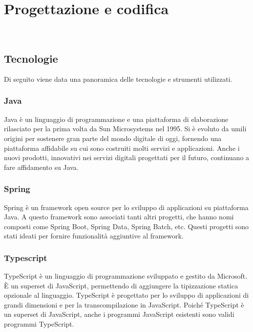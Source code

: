 
\chapter{Progettazione e codifica}
\label{cap:progettazione-codifica}

\\

\section{Tecnologie}
\label{sec:tecnologie-strumenti}

Di seguito viene data una panoramica delle tecnologie e strumenti utilizzati.

\subsection*{Java}
Java è un linguaggio di programmazione e una piattaforma di elaborazione 
rilasciato per la prima volta da Sun Microsystems nel 1995. Si è evoluto da umili
 origini per sostenere gran parte del mondo digitale di oggi, fornendo una
 piattaforma affidabile su cui sono costruiti molti servizi e applicazioni. 
 Anche i nuovi prodotti, innovativi nei servizi digitali progettati per il futuro,  
 continuano a fare affidamento su Java.
\subsection*{Spring}

Spring è un \gls{framework} open source per lo sviluppo di applicazioni su piattaforma Java.
A questo \gls{framework} sono associati tanti altri progetti, che hanno nomi composti come 
Spring Boot, Spring Data, Spring Batch, etc. Questi progetti sono stati ideati per
fornire funzionalità aggiuntive al \gls{framework}.

\subsection*{Typescript}
TypeScript è un linguaggio di programmazione sviluppato e gestito da Microsoft. 
È un \gls{superset} di JavaScript, permettendo di aggiungere la tipizzazione 
statica opzionale al linguaggio. TypeScript è progettato per lo sviluppo di applicazioni 
di grandi dimensioni e per la \gls{transcompilazione} in JavaScript. Poiché TypeScript è un \gls{superset} di JavaScript, anche i programmi JavaScript esistenti sono validi programmi TypeScript.

